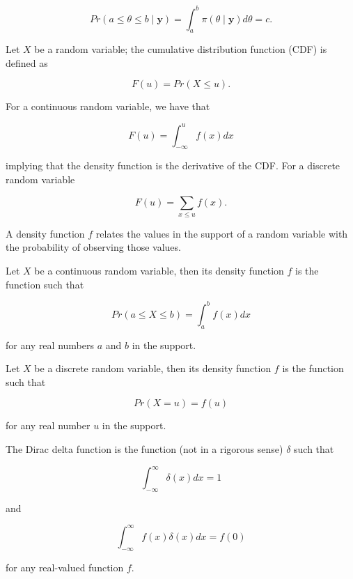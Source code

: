 \documentclass[
  letterpaper,
  DIV=11,
  numbers=noendperiod]{scrreprt}
\providecommand{\tightlist}{%
  \setlength{\itemsep}{0pt}\setlength{\parskip}{0pt}}\usepackage{longtable,booktabs,array}
\theoremstyle{definition}
\theoremstyle{plain}
\theoremstyle{definition}
\theoremstyle{remark}
\begin{document}
\[Pr(a \leq \theta \leq b \mid \mathbf{y}) = \int_{a}^{b} \pi(\theta \mid \mathbf{y})d\theta = c.\]

\begin{description}
\tightlist
\item[Cumulative Distribution Function (CDF) (Definition~\ref{def-cdf})]
Let \(X\) be a random variable; the cumulative distribution function
(CDF) is defined as
\end{description}

\[F(u) = Pr(X \leq u).\]

For a continuous random variable, we have that

\[F(u) = \int_{-\infty}^{u} f(x) dx\]

implying that the density function is the derivative of the CDF. For a
discrete random variable

\[F(u) = \sum_{x \leq u} f(x).\]

\begin{description}
\tightlist
\item[Density Function (Definition~\ref{def-density-function})]
A density function \(f\) relates the values in the support of a random
variable with the probability of observing those values.
\end{description}

Let \(X\) be a continuous random variable, then its density function
\(f\) is the function such that

\[Pr(a \leq X \leq b) = \int_a^b f(x) dx\]

for any real numbers \(a\) and \(b\) in the support.

Let \(X\) be a discrete random variable, then its density function \(f\)
is the function such that

\[Pr(X = u) = f(u)\]

for any real number \(u\) in the support.

\begin{description}
\tightlist
\item[Dirac Delta Function (Definition~\ref{def-dirac-delta})]
The Dirac delta function is the function (not in a rigorous sense)
\(\delta\) such that
\end{description}

\[\int_{-\infty}^{\infty} \delta(x) dx = 1\]

and

\[\int_{-\infty}^{\infty} f(x) \delta(x) dx = f(0)\]

for any real-valued function \(f\).
\end{document}
